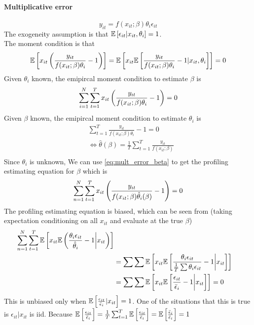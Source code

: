 \paragraph{Multiplicative error}
\begin{equation*}
    y_{it} = f(x_{it};\beta)\theta_i\epsilon_{it}
\end{equation*}
The exogeneity assumption is that $\mathbb{E}\left[\epsilon_{it}|x_{it},\theta_i\right]=1$.\\
The moment condition is that \begin{equation*}
    \mathbb{E}\left[x_{it}\left(\frac{y_{it}}{f(x_{it};\beta)\theta_i}-1\right)\right]=\mathbb{E}\left[x_{it} \mathbb{E}\left[\frac{y_{it}}{f(x_{it};\beta)\theta_i}-1|x_{it},\theta_i\right]\right]=0
\end{equation*}
Given $\theta_i$ known, the emipircal moment condition to estimate $\beta$ is \begin{equation}\label{eq:mult_error_beta}
    \sum_{i=1}^N\sum_{t=1}^T x_{it}\left(\frac{y_{it}}{f(x_{it};{\beta}){\theta}_i}-1\right)=0
\end{equation}
Given $\beta$ known, the emipircal moment condition to estimate $\theta_i$ is \begin{equation}
    \label{eq:mult_error_theta}
    \begin{split}
        &\sum_{t=1}^T {\frac{y_{it}}{f(x_{it};{\beta})\theta_i}-1}=0\\
        & \Leftrightarrow \hat{\theta}(\beta)=\frac{1}{T}\sum_{t=1}^T \frac{y_{it}}{f(x_{it};\beta)}\\

    \end{split}
\end{equation}
Since $\theta_i$ is unknown, We can use \ref{eq:mult_error_beta} to get the profiling estimating equation for $\beta$ which is \begin{equation*}
    \sum_{n=1}^N\sum_{t=1}^T x_{it}\left(\frac{y_{it}}{f(x_{it};\beta)\hat{\theta}_i(\beta)}-1\right)=0
\end{equation*}
The profiling estimating equation is biased, which can be seen from (taking expectation conditioning on all $x_{it}$ and evaluate at the true $\beta$) \begin{equation*}
    \begin{split}
        \sum_{n=1}^N\sum_{t=1}^T \mathbb{E}\left[x_{it}\mathbb{E}\left(\frac{\theta_i\epsilon_{it}}{\hat{\theta}_i}-1\bigg |x_{it}\right)\right]\\&=\sum \sum \mathbb{E}\left[x_{it}\mathbb{E}\left[\frac{\theta_i\epsilon_{it}}{\frac{1}{T}\sum{\theta_i \epsilon_{it}}}-1\bigg | x_{it}\right]\right]\\& = \sum \sum \mathbb{E}\left[x_{it}\mathbb{E} \left[\frac{\epsilon_{it}}{\bar{\epsilon}_{i}}-1\bigg | x_{it}\right]\right]=0
    \end{split}
\end{equation*}
This is unbiased only when $\mathbb{E}\left[\frac{\epsilon_{it}}{\bar{\epsilon}_i}|x_{it}\right]=1$. One of the situations that this is true is $\epsilon_{it}|x_{it}$ is iid. Because $\mathbb{E}\left[\frac{\epsilon_{it}}{\bar{\epsilon}_i}\right]=\frac{1}{T}\sum_{t=1}^T \mathbb{E}\left[\frac{\epsilon_{it}}{\bar{\epsilon}_i}\right]=\mathbb{E}\left[\frac{\bar{\epsilon}_i}{\bar{\epsilon}_i}\right]=1$

